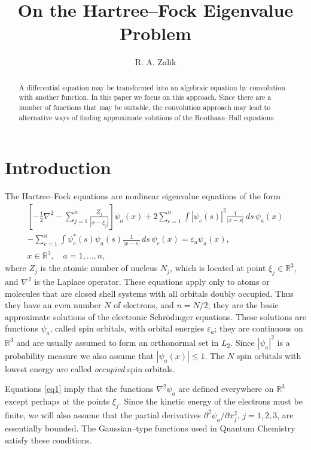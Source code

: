 \documentclass[english, reqno]{amsart}
\title{On the Hartree--Fock Eigenvalue Problem}
\author{R. A. Zalik}
\date{}
\newcommand{\del}{\mbox{$\partial$}}
\newcommand{\half}{\mbox{$\frac{1}{2}$}}
\newcommand{\IR}{\text{${\mathbb{R}}$}}
\begin{document}
\doublespacing


\begin{abstract}
A differential equation may be transformed into an algebraic equation by convolution with another function. In this paper we focus on this approach.
Since there are a number of functions that may be suitable, the convolution approach may lead to alternative ways of finding approximate solutions of the Roothaan--Hall equations.

 \end{abstract}

\maketitle


\pagestyle{myheadings}

\section{Introduction} \label{section1}

The  Hartree--Fock  equations are nonlinear eigenvalue equations of the form
\begin{multline} \label{eq1}
\left [-\half\nabla^2 - \sum_{j=1}^n \frac{Z_j}{|x-\xi_j|} \right] \psi_a(x)+2\sum_{c=1}^n \int |\psi_c(s)|^2 \frac{1}{|x-s|} \,ds\,\psi_a(x)\\
-\sum_{c=1}^n \int \psi_c^{\ast}(s)\psi_a(s) \frac{1}{|x-s|}\, ds\, \psi_c(x)=\varepsilon_a \psi_a(x),\\
x\in\IR^3, \quad a=1, \dots, n,
\end{multline}
where $Z_j$ is the atomic number of nucleus $N_j$, which is located at point $\xi_j \in \IR^3$, and $\nabla^2$  is the Laplace operator.
These equations apply only to atoms or molecules that are closed shell systems with all orbitals doubly occupied. Thus they have an
even number $N$ of electrons, and $n=N/2$; they are the basic approximate solutions of the electronic Schr\"odinger equations. These solutions are functions $\psi_a$, called spin orbitals, with orbital energies $\varepsilon_a$;  they are continuous on $\IR^3$ and are usually assumed to form an orthonormal set in $L_2$. Since $|\psi_a|^2$ is a probability measure we also assume that  $|\psi_a(x)| \le 1$. The $N$ spin orbitals with lowest energy are called \emph{occupied} spin orbitals. 

Equations \eqref{eq1} imply that the functions $\nabla^2\psi_a$ are defined everywhere on $\IR^3$ except perhaps at the points $\xi_j$. Since the kinetic energy of the electrons must be finite, we will also assume that the partial derivatives $\del^2\psi_a/\del x_j^2, \, j=1,2,3$,  are essentially bounded.  The Gaussian--type functions used in Quantum Chemistry satisfy these conditions.
\end{document}

